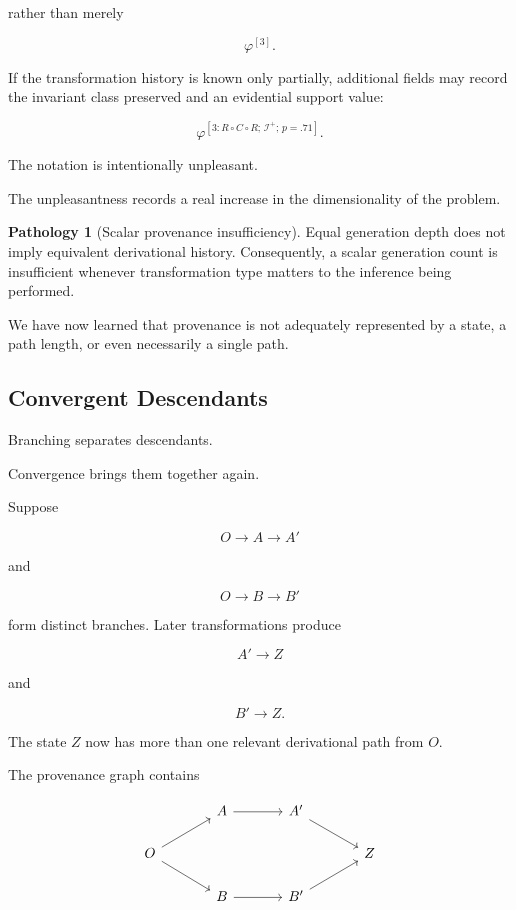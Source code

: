 \documentclass[
  11pt,
  a4paper,
  DIV=12,
  BCOR=0mm,
  parskip=half-
]{scrartcl}
\newcommand{\Inv}{\mathcal I}
\theoremstyle{definition}
\newtheorem{pathology}[definition]{Pathology}
\theoremstyle{plain}
\theoremstyle{remark}
\begin{document}
rather than merely

\[
  \varphi^{[3]}.
\]

If the transformation history is known only partially, additional fields may
record the invariant class preserved and an evidential support value:

\[
  \varphi^{[3:R\circ C\circ R;\,\Inv^{+};\,p=.71]}.
\]

The notation is intentionally unpleasant.

The unpleasantness records a real increase in the dimensionality of the
problem.

\begin{pathology}[Scalar provenance insufficiency]
\label{path:scalar-provenance}
Equal generation depth does not imply equivalent derivational history.
Consequently, a scalar generation count is insufficient whenever
transformation type matters to the inference being performed.
\end{pathology}

We have now learned that provenance is not adequately represented by a state,
a path length, or even necessarily a single path.


\subsection{Convergent Descendants}
\label{sec:convergent-descendants}

Branching separates descendants.

Convergence brings them together again.

Suppose

\[
  O\to A\to A'
\]

and

\[
  O\to B\to B'
\]

form distinct branches. Later transformations produce

\[
  A'\to Z
\]

and

\[
  B'\to Z.
\]

The state \(Z\) now has more than one relevant derivational path from \(O\).

The provenance graph contains

\[
\begin{tikzcd}[column sep=3.5em,row sep=1.6em]
& A \arrow[r] & A' \arrow[dr] & \\
O \arrow[ur] \arrow[dr] & & & Z \\
& B \arrow[r] & B' \arrow[ur] &
\end{tikzcd}
\]
\end{document}
